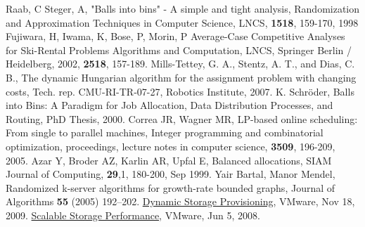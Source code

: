\documentclass{llncs}
\begin{document}
\begin{thebibliography}{99}
Raab, C Steger, A,
"Balls into bins" - A simple and tight analysis,
Randomization and Approximation Techniques in Computer Science, LNCS, {\bf 1518}, 159-170, 1998
Fujiwara, H, Iwama, K, Bose, P, Morin, P
Average-Case Competitive Analyses for Ski-Rental Problems
Algorithms and Computation, LNCS, Springer Berlin / Heidelberg, 2002, {\bf 2518}, 157-189.
Mills-Tettey, G. A., Stentz, A. T., and Dias, C. B.,
The dynamic Hungarian algorithm for the assignment problem with changing costs,
Tech. rep. CMU-RI-TR-07-27, Robotics Institute, 2007.
K. Schröder,
Balls into Bins: A Paradigm for Job Allocation, Data Distribution Processes, and Routing,
PhD Thesis, 2000.
Correa JR, Wagner MR, 
LP-based online scheduling: From single to parallel machines,
Integer programming and combinatorial optimization, proceedings, lecture notes in computer science, { \bf 3509}, 196-209, 2005. 
Azar Y, Broder AZ, Karlin AR, Upfal E, 
Balanced allocations,
SIAM Journal of Computing, {\bf 29},1, 180-200, Sep 1999.
Yair Bartal, Manor Mendel, 
Randomized k-server algorithms for growth-rate bounded graphs, 
Journal of Algorithms {\bf55} (2005) 192–202.
\href{http://www.vmware.com/files/pdf/VMware-DynamicStorageProv-WP-EN.pdf}{Dynamic Storage Provisioning},
VMware, Nov 18, 2009.
\href{http://www.vmware.com/files/pdf/scalable_storage_performance.pdf}{Scalable Storage Performance},
VMware, Jun 5, 2008.
\end{thebibliography}
\end{document}
